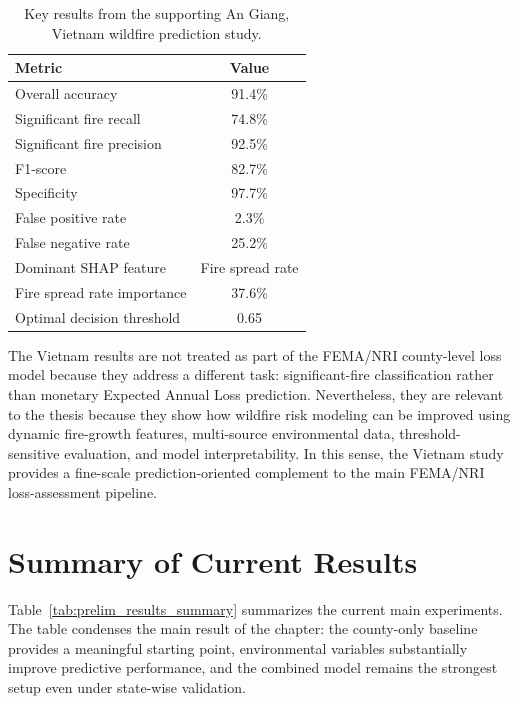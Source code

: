 \begin{table}[htbp]
\centering
\caption{Key results from the supporting An Giang, Vietnam wildfire prediction study.}
\label{tab:vietnam_study_results}
\begin{tabular}{lc}
\toprule
Metric & Value \\
\midrule
Overall accuracy & 91.4\% \\
Significant fire recall & 74.8\% \\
Significant fire precision & 92.5\% \\
F1-score & 82.7\% \\
Specificity & 97.7\% \\
False positive rate & 2.3\% \\
False negative rate & 25.2\% \\
Dominant SHAP feature & Fire spread rate \\
Fire spread rate importance & 37.6\% \\
Optimal decision threshold & 0.65 \\
\bottomrule
\end{tabular}
\end{table}

The Vietnam results are not treated as part of the FEMA/NRI county-level loss model because they address a different task: significant-fire classification rather than monetary Expected Annual Loss prediction. Nevertheless, they are relevant to the thesis because they show how wildfire risk modeling can be improved using dynamic fire-growth features, multi-source environmental data, threshold-sensitive evaluation, and model interpretability. In this sense, the Vietnam study provides a fine-scale prediction-oriented complement to the main FEMA/NRI loss-assessment pipeline.

\section{Summary of Current Results}

Table~\ref{tab:prelim_results_summary} summarizes the current main experiments. The table condenses the main result of the chapter: the county-only baseline provides a meaningful starting point, environmental variables substantially improve predictive performance, and the combined model remains the strongest setup even under state-wise validation.

